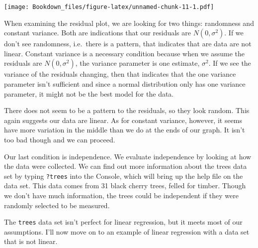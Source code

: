 \documentclass[
]{book}
\newenvironment{Shaded}{\begin{snugshade}}{\end{snugshade}}
\newcommand{\DataTypeTok}[1]{\textcolor[rgb]{0.13,0.29,0.53}{#1}}
\newcommand{\DecValTok}[1]{\textcolor[rgb]{0.00,0.00,0.81}{#1}}
\newcommand{\KeywordTok}[1]{\textcolor[rgb]{0.13,0.29,0.53}{\textbf{#1}}}
\newcommand{\NormalTok}[1]{#1}
\newcommand{\OperatorTok}[1]{\textcolor[rgb]{0.81,0.36,0.00}{\textbf{#1}}}
\newcommand{\StringTok}[1]{\textcolor[rgb]{0.31,0.60,0.02}{#1}}
\begin{document}
\begin{Shaded}
\end{Shaded}

\texttt{[image: Bookdown\_files/figure-latex/unnamed-chunk-11-1.pdf]}

When examining the residual plot, we are looking for two things: randomness and constant variance. Both are indications that our residuals are \(N(0,\sigma^2)\). If we don't see randomness, i.e.~there is a pattern, that indicates that are data are not linear. Constant variance is a necessary condition because when we assume the residuals are \(N(0,\sigma^2)\), the variance parameter is one estimate, \(\sigma^2\). If we see the variance of the residuals changing, then that indicates that the one variance parameter isn't sufficient and since a normal distribution only has one variance parameter, it might not be the best model for the data.

There does not seem to be a pattern to the residuals, so they look random. This again suggests our data are linear. As for constant variance, however, it seems have more variation in the middle than we do at the ends of our graph. It isn't too bad though and we can proceed.

Our last condition is independence. We evaluate independence by looking at how the data were collected. We can find out more information about the trees data set by typing \texttt{?trees} into the Console, which will bring up the help file on the data set. This data comes from 31 black cherry trees, felled for timber. Though we don't have much information, the trees could be independent if they were randomly selected to be measured.

The \texttt{trees} data set isn't perfect for linear regression, but it meets most of our assumptions. I'll now move on to an example of linear regression with a data set that is not linear.
\end{document}

